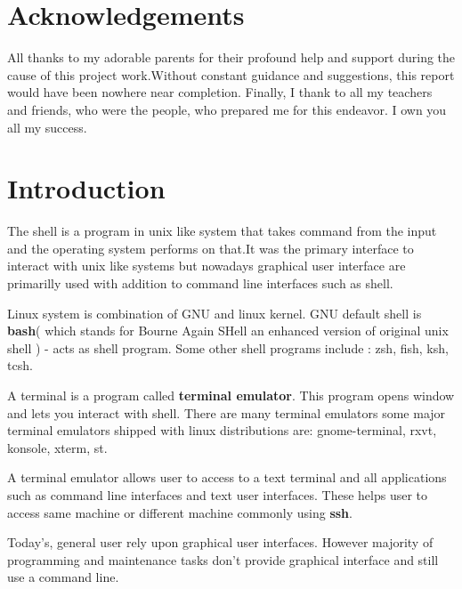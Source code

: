 \documentclass[12pt,a4paper,oneside]{report}
\begin{document}
\nocite{*}


\pagestyle{plain}


\pagebreak
\tableofcontents

\chapter*{Acknowledgements}
\thispagestyle{empty}

All thanks to my adorable parents for their profound help and support during the cause of this project work.Without constant guidance and suggestions, this report would have been nowhere near completion.
     Finally, I thank to all my teachers and friends, who were the people, who prepared me for this endeavor. I own you all my success. 

\clearpage



\chapter*{Introduction}
The shell is a program in unix like system that takes command from the input and the operating system performs on that.It was the primary interface to interact with unix like systems but nowadays graphical user interface are primarilly used with addition to command line interfaces such as shell.

Linux system is combination of GNU and linux kernel. GNU default shell is \textbf{bash}( which stands for Bourne Again SHell an enhanced version of original unix shell ) - acts as shell program. Some other shell programs include : zsh, fish, ksh, tcsh.

A terminal is a program called \textbf{terminal emulator}. This program opens window and lets you interact with shell.
There are many terminal emulators some major terminal emulators shipped with linux distributions are: gnome-terminal, rxvt, konsole, xterm, st.

A terminal emulator allows user to access to a text terminal and all applications such as command line interfaces and text user interfaces. These helps user to access same machine or different machine commonly using \textbf{ssh}.

Today's, general user rely upon graphical user interfaces. However majority of programming and maintenance tasks don't provide graphical interface and still use a command line.
\end{document}
